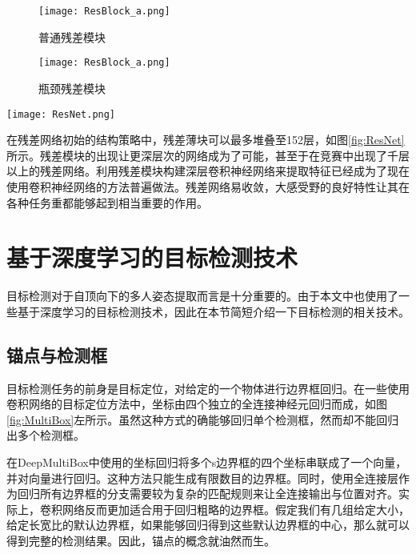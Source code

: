 \begin{figure*}[htbp]	
	\centering
	\begin{subfigure}[b]{0.35\textwidth}
		\texttt{[image: ResBlock\_a.png]}
		\caption{普通残差模块}
	\end{subfigure}
	\hskip1.5cm
	\begin{subfigure}[b]{0.35\textwidth}
		\texttt{[image: ResBlock\_a.png]}
		\caption{瓶颈残差模块}
	\end{subfigure}
	\caption{残差模块结构\cite{He2015Deep}}
	\label{fig:Resblock}
\end{figure*}
\begin{figure*}[htbp]	
	\centering
	\texttt{[image: ResNet.png]}
	\caption{残差网络结构\cite{He2015Deep}}
	\label{fig:ResNet}
\end{figure*}

在残差网络初始的结构策略中，残差薄块可以最多堆叠至152层，如图\ref{fig:ResNet}所示。残差模块的出现让更深层次的网络成为了可能，甚至于在竞赛中出现了千层以上的残差网络。利用残差模块构建深层卷积神经网络来提取特征已经成为了现在使用卷积神经网络的方法普遍做法。残差网络易收敛，大感受野的良好特性让其在各种任务重都能够起到相当重要的作用。

\section{基于深度学习的目标检测技术}
\label{sec:factsobjectdetection}
目标检测对于自顶向下的多人姿态提取而言是十分重要的。由于本文中也使用了一些基于深度学习的目标检测技术，因此在本节简短介绍一下目标检测的相关技术。

\subsection{锚点与检测框}
\label{subsec:factsanchors}
目标检测任务的前身是目标定位，对给定的一个物体进行边界框回归\cite{ILSVRC15}。在一些使用卷积网络的目标定位方法中，坐标由四个独立的全连接神经元回归而成，如图\ref{fig:MultiBox}左所示。虽然这种方式的确能够回归单个检测框，然而却不能回归出多个检测框。

在DeepMultiBox中使用的坐标回归\cite{erhan2014scalable}将多个s边界框的四个坐标串联成了一个向量，并对向量进行回归。这种方法只能生成有限数目的边界框。同时，使用全连接层作为回归所有边界框的分支需要较为复杂的匹配规则来让全连接输出与位置对齐。实际上，卷积网络反而更加适合用于回归粗略的边界框。假定我们有几组给定大小，给定长宽比的默认边界框，如果能够回归得到这些默认边界框的中心，那么就可以得到完整的检测结果。因此，锚点的概念就油然而生。

